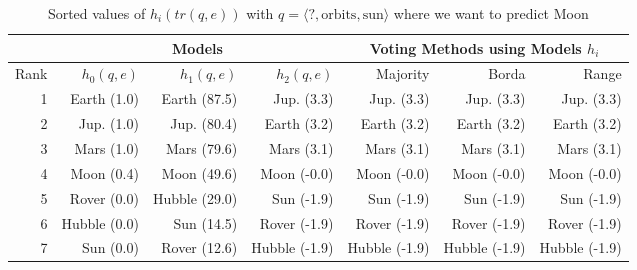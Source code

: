 \begin{table} 
\centering 
\begin{tabular}{r|r|r|r|r|r|r}
&\multicolumn{3}{|c|}{Models}&
\multicolumn{3}{|c}{Voting Methods using Models $h_i$}\\
 \hline 
Rank &$h_0(q, e)$ &$h_1(q, e)$ &$h_2(q, e)$ &Majority &Borda &Range\\
\hline
1 &Earth (1.0)&		Earth (87.5)&		Jup. (3.3)&		Jup. (3.3) &Jup. (3.3) &Jup. (3.3)\\
2 &Jup. (1.0)&		Jup. (80.4)&		Earth (3.2)&		Earth (3.2) &Earth (3.2) &Earth (3.2)\\
3 &Mars (1.0)&		Mars (79.6)&		Mars (3.1)&		Mars (3.1) &Mars (3.1) &Mars (3.1)\\
4 &Moon (0.4)&		Moon (49.6)&		Moon (-0.0)&		Moon (-0.0) &Moon (-0.0) &Moon (-0.0)\\
\hline \hline
5 &Rover (0.0)&		Hubble (29.0)&		Sun (-1.9)&		Sun (-1.9) &Sun (-1.9) &Sun (-1.9)\\
6 &Hubble (0.0)&		Sun (14.5)&		Rover (-1.9)&		Rover (-1.9) &Rover (-1.9) &Rover (-1.9)\\
7 &Sun (0.0)&		Rover (12.6)&		Hubble (-1.9)&		Hubble (-1.9) &Hubble (-1.9) &Hubble (-1.9)\\
\end{tabular}
\caption{Sorted values of $h_i(tr(q,e))$ with $q=\langle ?, \text{orbits}, \text{sun} \rangle$ where we want to predict Moon}
\end{table}
